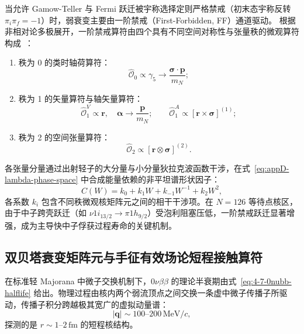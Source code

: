 当允许 Gamow-Teller 与 Fermi 跃迁被宇称选择定则严格禁戒（初末态宇称反转 $\pi_i \pi_f = -1$）时，弱衰变主要由一阶禁戒（First-Forbidden, FF）通道驱动。
根据非相对论多极展开，一阶禁戒算符由四个具有不同空间对称性与张量秩的微观算符构成~\cite{doctoral-r1-g34-zhi-2013-prc-shell-model-half-lives}：
\begin{enumerate}
\item 秩为 0 的类时轴荷算符：
\begin{equation}\label{eq:appD-ff-rank0}
\hat{\mathcal{O}}_0 \propto \gamma_5 \to \frac{\boldsymbol{\sigma} \cdot \mathbf{p}}{m_N};
\end{equation}
\item 秩为 1 的矢量算符与轴矢量算符：
\begin{equation}\label{eq:appD-ff-rank1}
\hat{\mathcal{O}}_1^V \propto \mathbf{r}, \quad \boldsymbol{\alpha} \to \frac{\mathbf{p}}{m_N}; \qquad \hat{\mathcal{O}}_1^A \propto [\mathbf{r} \times \boldsymbol{\sigma}]^{(1)};
\end{equation}
\item 秩为 2 的空间张量算符：
\begin{equation}\label{eq:appD-ff-rank2}
\hat{\mathcal{O}}_2 \propto [\mathbf{r} \otimes \boldsymbol{\sigma}]^{(2)}.
\end{equation}
\end{enumerate}
各张量分量通过出射轻子的大分量与小分量狄拉克波函数干涉，在式~\eqref{eq:appD-lambda-phase-space} 中合成能量依赖的非平坦谱形状因子：
\begin{equation}\label{eq:appD-ff-shape-factor}
C(W) = k_0 + k_1 W + k_{-1} W^{-1} + k_2 W^2,
\end{equation}
各系数 $k_i$ 包含不同秩微观核矩阵元之间的相干干涉项。在 $N=126$ 等待点核区，由于中子跨壳跃迁（如 $\nu 1i_{13/2} \to \pi 1h_{9/2}$）受泡利阻塞压低，一阶禁戒跃迁显著增强，成为主导快中子俘获过程寿命的关键机制。

\subsection{双贝塔衰变矩阵元与手征有效场论短程接触算符}

在标准轻 Majorana 中微子交换机制下，$0\nu\beta\beta$ 的理论半衰期由式~\eqref{eq:4-7-0nubb-halflife} 给出。物理过程由核内两个弱流顶点之间交换一条虚中微子传播子所驱动，传播子积分跨越极其宽广的虚拟动量谱：
\begin{equation}\label{eq:appD-0nubb-virtual-momentum}
|\mathbf{q}| \sim 100\text{--}200\,\mathrm{MeV}/c,
\end{equation}
探测的是 $r \sim 1$–$2\,\text{fm}$ 的短程核结构。

